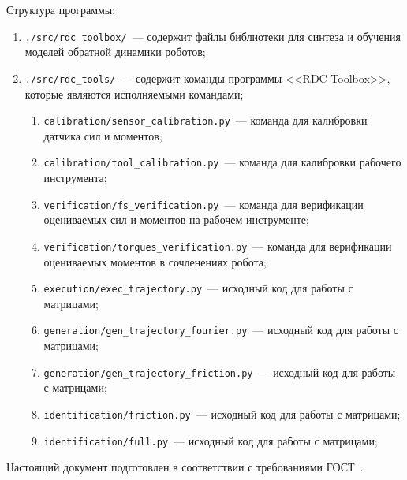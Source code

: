 Структура программы:
\begin{enumerate}
    \item \verb|./src/rdc_toolbox/|~--- содержит файлы библиотеки для синтеза и обучения моделей обратной динамики роботов;
    \item \verb|./src/rdc_tools/|~--- содержит команды программы <<RDC Toolbox>>, которые являются исполняемыми командами;
    \begin{enumerate}
        \item \verb|calibration/sensor_calibration.py|~--- команда для калибровки датчика сил и моментов;
        \item \verb|calibration/tool_calibration.py|~--- команда для калибровки рабочего инструмента;

        \item \verb|verification/fs_verification.py|~--- команда для верификации оцениваемых сил и моментов на рабочем инструменте;
        \item \verb|verification/torques_verification.py|~--- команда для верификации оцениваемых моментов в сочленениях робота;
        
        \item \verb|execution/exec_trajectory.py|~--- исходный код для работы с матрицами;
        
        \item \verb|generation/gen_trajectory_fourier.py|~--- исходный код для работы с матрицами;
        \item \verb|generation/gen_trajectory_friction.py|~--- исходный код для работы с матрицами;

        \item \verb|identification/friction.py|~--- исходный код для работы с матрицами;
        \item \verb|identification/full.py|~--- исходный код для работы с матрицами;
    \end{enumerate}
\end{enumerate}


Настоящий документ подготовлен в соответствии с требованиями ГОСТ~\cite{gost19106}.

